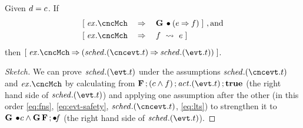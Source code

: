 \begin{Theorem}
  \label{thm:strengthen-fns}
  Given $d = c$. If
  \begin{align}
    \label{eq:fns}
    \ew{\execution.\cncMch \WIDE{&\limp} \G \initially(\cncfsched \limp
      \fsched)}~, \textrm{and} \\
    \label{eq:lts}
    \ew{\execution.\cncMch \WIDE{&\limp} \fsched \wide\leadsto \cncfsched}
  \end{align}
  then $\ew{\execution.\cncMch \limp (\schedule.(\cncevt.t) \limp \schedule.(\evt.t))}$.
\end{Theorem}
\begin{proof}[Sketch] We can prove  
  $\schedule.(\evt.t)$ under the assumptions 
  $\schedule.(\cncevt.t)$ and $\execution.\cncMch$ 
  by calculating from $\F \, ; (\csched \land \fsched) \, ; \action.(\evt.t)\, ; \ctrue$ 
  (the right hand side of $\schedule.(\evt.t)$) and applying 
  one assumption after the other (in this order \eqref{eq:fns}, 
  \eqref{eq:evt-safety}, $\schedule.(\cncevt.t)$, \eqref{eq:lts}) 
  to strengthen it to $\mathbf{G}\, \bullet\! c \land \mathbf{G}\, \mathbf{F}\,;\bullet\!f$ 
  (the right hand side of $\schedule.(\evt.t)$).
% 
\end{proof}

